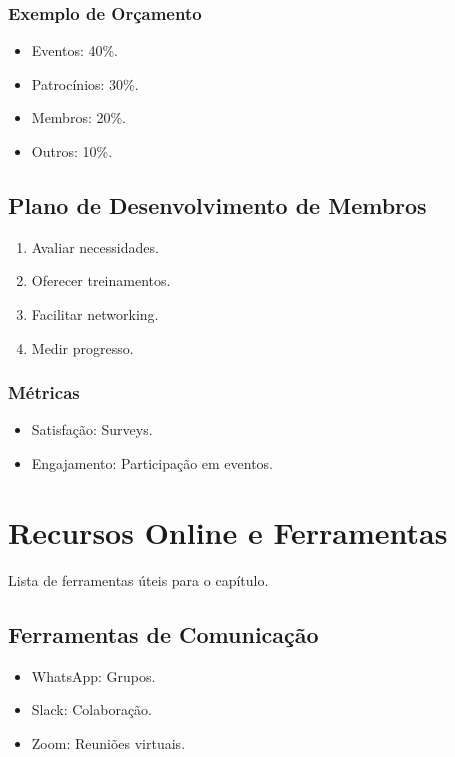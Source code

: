 \documentclass[12pt]{article}
\begin{document}
\subsubsection{Exemplo de Orçamento}
\begin{itemize}
    \item Eventos: 40\%.
    \item Patrocínios: 30\%.
    \item Membros: 20\%.
    \item Outros: 10\%.
\end{itemize}

\subsection{Plano de Desenvolvimento de Membros}
\begin{enumerate}
    \item Avaliar necessidades.
    \item Oferecer treinamentos.
    \item Facilitar networking.
    \item Medir progresso.
\end{enumerate}

\subsubsection{Métricas}
\begin{itemize}
    \item Satisfação: Surveys.
    \item Engajamento: Participação em eventos.
\end{itemize}

\newpage

\section{Recursos Online e Ferramentas}

Lista de ferramentas úteis para o capítulo.

\subsection{Ferramentas de Comunicação}
\begin{itemize}
    \item WhatsApp: Grupos.
    \item Slack: Colaboração.
    \item Zoom: Reuniões virtuais.
\end{itemize}
\end{document}
